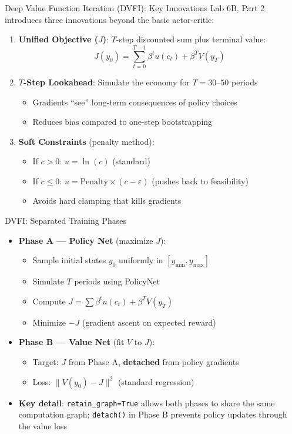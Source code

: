\documentclass[10pt,english,aspectratio=169]{beamer}
\begin{document}
\begin{frame}{Deep Value Function Iteration (DVFI): Key Innovations}
Lab 6B, Part 2 introduces three innovations beyond the basic actor-critic:

\begin{enumerate}
  \item \textbf{Unified Objective ($J$)}: $T$-step discounted sum plus terminal value:
    \[
      J(y_0) = \sum_{t=0}^{T-1} \beta^t u(c_t) + \beta^T V(y_T)
    \]
  \medskip
  \item \textbf{$T$-Step Lookahead}: Simulate the economy for $T = 30$--$50$ periods
    \begin{itemize}
      \item Gradients ``see'' long-term consequences of policy choices
      \item Reduces bias compared to one-step bootstrapping
    \end{itemize}
  \medskip
  \item \textbf{Soft Constraints} (penalty method):
    \begin{itemize}
      \item If $c > 0$: $u = \ln(c)$ \quad (standard)
      \item If $c \leq 0$: $u = \text{Penalty} \times (c - \varepsilon)$ \quad (pushes back to feasibility)
      \item Avoids hard clamping that kills gradients
    \end{itemize}
\end{enumerate}
\end{frame}

\begin{frame}{DVFI: Separated Training Phases}
\begin{itemize}
  \item \textbf{Phase A --- Policy Net} (maximize $J$):
    \begin{itemize}
      \item Sample initial states $y_0$ uniformly in $[y_{\min}, y_{\max}]$
      \item Simulate $T$ periods using PolicyNet
      \item Compute $J = \sum \beta^t u(c_t) + \beta^T V(y_T)$
      \item Minimize $-J$ (gradient ascent on expected reward)
    \end{itemize}
  \medskip
  \item \textbf{Phase B --- Value Net} (fit $V$ to $J$):
    \begin{itemize}
      \item Target: $J$ from Phase A, \textbf{detached} from policy gradients
      \item Loss: $\|V(y_0) - J\|^2$ (standard regression)
    \end{itemize}
  \medskip
  \item \textbf{Key detail}: \texttt{retain\_graph=True} allows both phases to share the same computation graph; \texttt{detach()} in Phase B prevents policy updates through the value loss
\end{itemize}
\end{frame}
\end{document}

